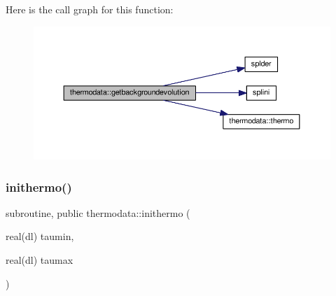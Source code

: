 Here is the call graph for this function\+:
\nopagebreak
\begin{figure}[H]
\begin{center}
\leavevmode
\includegraphics[width=350pt]{namespacethermodata_a94d40d05e68eca4db87b58269d19e6f3_cgraph}
\end{center}
\end{figure}
\mbox{\label{namespacethermodata_a6d995eb9ad9f563fec198222c168e097}} 
\subsubsection{\texorpdfstring{inithermo()}{inithermo()}}
{\footnotesize\ttfamily subroutine, public thermodata\+::inithermo (\begin{DoxyParamCaption}\item[{real(dl)}]{taumin,  }\item[{real(dl)}]{taumax }\end{DoxyParamCaption})}



